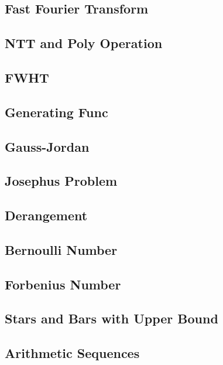 \subsection{Fast Fourier Transform}

\subsection{NTT and Poly Operation}

\subsection{FWHT}

\subsection{Generating Func}

\subsection{Gauss-Jordan}

\subsection{Josephus Problem}

\subsection{Derangement}

\subsection{Bernoulli Number}

\subsection{Forbenius Number}

\subsection{Stars and Bars with Upper Bound}

\subsection{Arithmetic Sequences}

